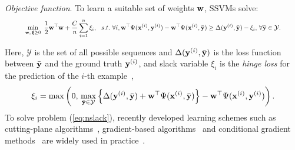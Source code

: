 \emph{Objective function}.
To learn a suitable set of weights $\mathbf{w}$, SSVMs solve: %
\begin{equation}
\label{eq:nslack}
\resizebox{0.9\linewidth}{!}{$\displaystyle
\begin{aligned}
\min_{\w, \, \bm{\xi} \ge 0} ~\frac{1}{2} \w^\top \w + \frac{C}{n} \sum_{i=1}^n \xi_i,  ~~s.t.~  \forall i, 
  \w^\top \Psi(\x^{(i)}, \y^{(i)}) - \w^\top \Psi(\x^{(i)}, \bar{\y}) \ge
  \Delta(\y^{(i)}, \bar{\y}) - \xi_i, \, \forall \bar\y \in \mathcal{Y}.
\end{aligned}
$}
\end{equation}

Here, 
$\mathcal{Y}$ is the set of all possible sequences
and $\Delta(\mathbf{y}^{(i)}, \bar{\mathbf{y}})$ is the loss function between $\bar{\mathbf{y}}$ and the ground truth $\mathbf{y}^{(i)}$,
and slack variable $\xi_i$ is the \emph{hinge loss} for the prediction of the $i$-th example~\cite{tsochantaridis2005large},
\begin{equation}
\label{eq:hingeloss}
\xi_i = \max \left( 0, \, 
        \max_{\bar{\mathbf{y}} \in \mathcal{Y}}
        \left\{ \Delta(\mathbf{y}^{(i)}, \bar{\mathbf{y}}) + \mathbf{w}^\top \Psi(\mathbf{x}^{(i)}, \bar{\mathbf{y}}) \right\} - \mathbf{w}^\top \Psi(\mathbf{x}^{(i)}, \mathbf{y}^{(i)}) \right).
\end{equation}
To solve problem (\ref{eq:nslack}),
recently developed learning schemes such as 
cutting-plane algorithms~\cite{joachims2009predicting}, %
gradient-based algorithms~\cite{ratliff2006subgradient} %
and conditional gradient methods~\cite{lacoste2013block} %
are widely used in practice~\cite{muller2014methods}.


